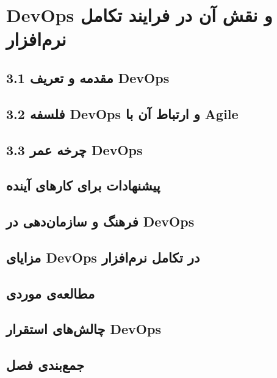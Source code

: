 \chapter{DevOps و نقش آن در فرایند تکامل نرم‌افزار}

\section{3.1 مقدمه و تعریف DevOps}
\label{sec:ch3-Definition}


\section{3.2 فلسفه DevOps و ارتباط آن با Agile}
\label{sec:ch3-DevOpsVSAgile}


\section{3.3 چرخه عمر DevOps}
\label{sec:ch3-LifeCicle}


\section{پیشنهادات برای کارهای آینده}
\label{sec:ch4-future}



\section{فرهنگ و سازمان‌دهی در DevOps}
\label{sec:ch3-5-culture}



\section{مزایای DevOps در تکامل نرم‌افزار}
\label{sec:ch3-6-benefits}


\section{مطالعه‌ی موردی}
\label{sec:ch3-7-case-study}


\section{چالش‌های استقرار DevOps}
\label{sec:ch3-8-challenges}



\section{جمع‌بندی فصل}
\label{sec:ch3-9-summary}

